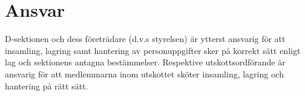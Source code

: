 \documentclass{dsekprotokoll}
\begin{document}
\section{Ansvar}
D-sektionen och dess företrädare (d.v.s styrelsen) är ytterst ansvarig för att insamling, lagring samt hantering av personuppgifter sker på korrekt sätt enligt lag och sektionens antagna bestämmelser. Respektive utskottsordförande är ansvarig för att medlemmarna inom utskottet
sköter insamling, lagring och hantering på rätt sätt.

\end{document}

